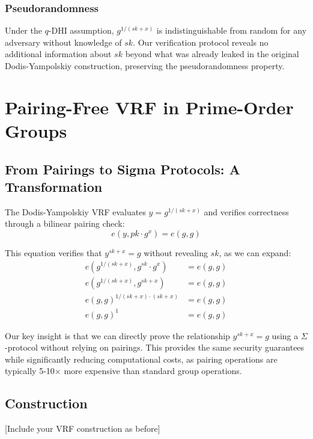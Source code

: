 \subsubsection*{Pseudorandomness}
Under the $q$-DHI assumption, $g^{1/(sk+x)}$ is indistinguishable from random for any adversary without knowledge of $sk$. Our verification protocol reveals no additional information about $sk$ beyond what was already leaked in the original Dodis-Yampolskiy construction, preserving the pseudorandomness property.
















\section{Pairing-Free VRF in Prime-Order Groups}

\subsection{From Pairings to Sigma Protocols: A Transformation}

The Dodis-Yampolskiy VRF \cite{hutchison_verifiable_2005} evaluates $y = g^{1/(sk+x)}$ and verifies correctness through a bilinear pairing check:
\begin{equation}
e(y, pk \cdot g^x) = e(g, g)
\end{equation}

This equation verifies that $y^{sk+x} = g$ without revealing $sk$, as we can expand:
\begin{align}
e(g^{1/(sk+x)}, g^{sk} \cdot g^x) &= e(g, g)\\
e(g^{1/(sk+x)}, g^{sk+x}) &= e(g, g)\\
e(g, g)^{1/(sk+x) \cdot (sk+x)} &= e(g, g)\\
e(g, g)^1 &= e(g, g)
\end{align}

Our key insight is that we can directly prove the relationship $y^{sk+x} = g$ using a $\Sigma$-protocol without relying on pairings. This provides the same security guarantees while significantly reducing computational costs, as pairing operations are typically 5-10× more expensive than standard group operations.

\subsection{Construction}
[Include your VRF construction as before]

